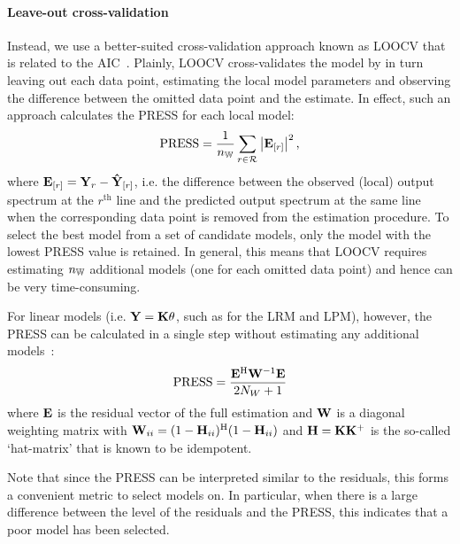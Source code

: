 \paragraph{Leave-out cross-validation}
Instead, we use a better-suited cross-validation approach known as \gls{LOOCV} that is related to the \gls{AIC}~\citep{Stone1977}.
Plainly, \gls{LOOCV} cross-validates the model by in turn leaving out each data point, estimating the local model parameters and observing the difference between the omitted data point and the estimate.
In effect, such an approach calculates the \gls{PRESS} for each local model:
\begin{equation}
 \PRESS = 
 \frac{1}{\nWind} 
  \sum_{r \in \LocalShifts{}}
    \abs{\ignoring{r}{\LocalVector{E}}}^2
    \text{,}
\label{eq:PRESS-general}
\end{equation}
where $\ignoring{r}{\LocalVector{E}} = \LocalVector{Y}_{r} - \ignoring{r}{\LocalVector{\estimated{Y}}}$, i.e. the difference between the observed (local) output spectrum at the $r^{\text{th}}$ line and the predicted output spectrum at the same line when the corresponding data point is removed from the estimation procedure.
To select the best model from a set of candidate models, only the model with the lowest \gls{PRESS} value is retained.
In general, this means that \gls{LOOCV} requires estimating $\nWind$ additional models (one for each omitted data point) and hence can be very time-consuming.

For linear models (i.e. $\LocalVector{Y} = \LocalMatrix{K} \LocalVector{\theta}$, such as for the \gls{LRM} and \gls{LPM}), however, the \gls{PRESS} can be calculated in a single step without estimating any additional models~\citep[Sec.~12.3.2]{Seber2003}:
\begin{equation}
\PRESS = \frac{\LocalVector{E}^{\HT} \LocalVector{W}^{-1} \LocalVector{E}}{2N_W + 1}
\end{equation}
where $\LocalVector{E}$ is the residual vector of the full estimation and $\LocalVector{W}$ is a diagonal weighting matrix with $\LocalVector{W}_{ii} = (1 - \LocalVector{H}_{ii})^{\HT} (1 - \LocalVector{H}_{ii})$ and
$\LocalVector{H} = \LocalMatrix{K} \pinv{\LocalMatrix{K}}$ is the so-called `hat-matrix' that is known to be idempotent.

Note that since the \gls{PRESS} can be interpreted similar to the residuals, this forms a convenient metric to select models on.
In particular, when there is a large difference between the level of the residuals and the \gls{PRESS}, this indicates that a poor model has been selected.

